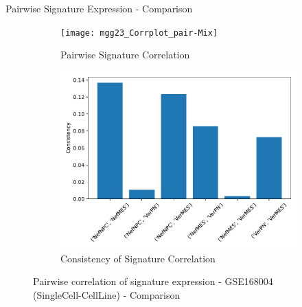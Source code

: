 \documentclass[aspectratio=169,9pt]{beamer}
\begin{document}
    \begin{frame}{Pairwise Signature Expression - Comparison}
        \begin{adjustwidth}{-5cm}{-5cm}
            \centering
            \begin{figure}\ContinuedFloat
                \centering
                \begin{subfigure}[c]{0.7\textwidth}
                    \centering
                    \texttt{[image: mgg23\_Corrplot\_pair-Mix]}
                    \caption{Pairwise Signature Correlation}
                \end{subfigure}
                \begin{subfigure}[c]{0.4\textwidth}
                    \centering
                    \includegraphics[width=\textwidth]{mgg23_Consistency_Mix}
                    \caption{Consistency of Signature Correlation}
                \end{subfigure}
                \caption{Pairwise correlation of signature expression - GSE168004 (SingleCell-CellLine) - Comparison}
            \end{figure}
        \end{adjustwidth}
    \end{frame}
\end{document}
